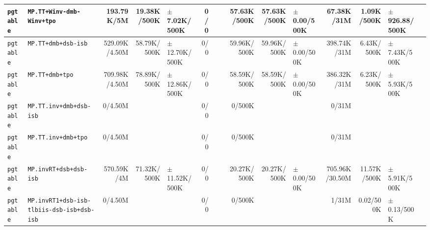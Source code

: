 \begin{tabular}{l l  | r r l | r r l | r r l | r r l l}
     \verb|pgtable| &                             \verb|MP.TT+Winv-dmb-Winv+tpo| &     193.79K/5M &           19.38K/500K &  $\pm$ 7.02K/500K &            0/0 &                       &                 &    57.63K/500K &           57.63K/500K &   $\pm$ 0.00/500K &     67.38K/31M &            1.09K/500K & $\pm$ 926.88/500K & \\ \hline 
     \verb|pgtable| &                                   \verb|MP.TT+dmb+dsb-isb| &  529.09K/4.50M &           58.79K/500K & $\pm$ 12.70K/500K &            0/0 &                       &                 &    59.96K/500K &           59.96K/500K &   $\pm$ 0.00/500K &    398.74K/31M &            6.43K/500K &  $\pm$ 7.43K/500K & \\ \hline 
     \verb|pgtable| &                                       \verb|MP.TT+dmb+tpo| &  709.98K/4.50M &           78.89K/500K & $\pm$ 12.86K/500K &            0/0 &                       &                 &    58.59K/500K &           58.59K/500K &   $\pm$ 0.00/500K &    386.32K/31M &            6.23K/500K &  $\pm$ 5.93K/500K & \\ \hline 
     \verb|pgtable| &                               \verb|MP.TT.inv+dmb+dsb-isb| &        0/4.50M &                       &                   &            0/0 &                       &                 &         0/500K &                       &                   &          0/31M &                       &                   & \\ \hline 
     \verb|pgtable| &                                   \verb|MP.TT.inv+dmb+tpo| &        0/4.50M &                       &                   &            0/0 &                       &                 &         0/500K &                       &                   &          0/31M &                       &                   & \\ \hline 
     \verb|pgtable| &                                \verb|MP.invRT+dsb+dsb-isb| &     570.59K/4M &           71.32K/500K & $\pm$ 11.52K/500K &            0/0 &                       &                 &    20.27K/500K &           20.27K/500K &   $\pm$ 0.00/500K & 705.96K/30.50M &           11.57K/500K &  $\pm$ 5.91K/500K & \\ \hline 
     \verb|pgtable| &            \verb|MP.invRT1+dsb-isb-tlbiis-dsb-isb+dsb-isb| &        0/4.50M &                       &                   &            0/0 &                       &                 &         0/500K &                       &                   &          1/31M &             0.02/500K &   $\pm$ 0.13/500K & \\ \hline 

\end{tabular}
